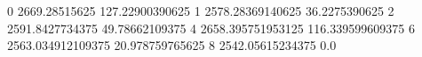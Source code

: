 0 2669.28515625 127.22900390625
1 2578.28369140625 36.2275390625
2 2591.8427734375 49.78662109375
4 2658.395751953125 116.339599609375
6 2563.034912109375 20.978759765625
8 2542.05615234375 0.0
